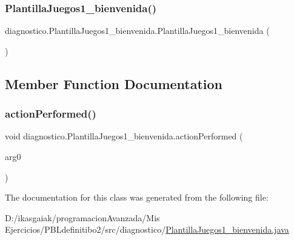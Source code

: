 \subsubsection{\texorpdfstring{Plantilla\+Juegos1\+\_\+bienvenida()}{PlantillaJuegos1\_bienvenida()}}
{\footnotesize\ttfamily diagnostico.\+Plantilla\+Juegos1\+\_\+bienvenida.\+Plantilla\+Juegos1\+\_\+bienvenida (\begin{DoxyParamCaption}{ }\end{DoxyParamCaption})}



\subsection{Member Function Documentation}
\mbox{\label{classdiagnostico_1_1_plantilla_juegos1__bienvenida_a6a545808a078575c0891eb9e7a79169c}} 
\subsubsection{\texorpdfstring{action\+Performed()}{actionPerformed()}}
{\footnotesize\ttfamily void diagnostico.\+Plantilla\+Juegos1\+\_\+bienvenida.\+action\+Performed (\begin{DoxyParamCaption}\item[{Action\+Event}]{arg0 }\end{DoxyParamCaption})}



The documentation for this class was generated from the following file\+:\begin{DoxyCompactItemize}
\item 
D\+:/ikasgaiak/programacion\+Avanzada/\+Mis Ejercicios/\+P\+B\+Ldefinitibo2/src/diagnostico/\mbox{\hyperlink{_plantilla_juegos1__bienvenida_8java}{Plantilla\+Juegos1\+\_\+bienvenida.\+java}}\end{DoxyCompactItemize}
